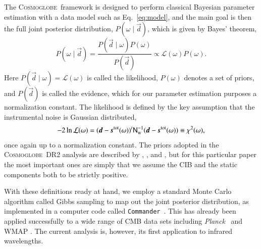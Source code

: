 \documentclass{aa}
\def\commander{\texttt{Commander}}
\def\Planck{\textit{Planck}}
\newcommand{\dv}[0]{\vec{d}}
\newcommand{\s}[0]{\vec{s}}
\newcommand{\N}[0]{\tens{N}}
\newcommand{\cosmoglobe}{\textsc{Cosmoglobe}}
\begin{document}

The \cosmoglobe\ framework is designed to perform classical Bayesian
parameter estimation with a data model such as Eq.~\eqref{eq:model},
and the main goal is then the full joint posterior distribution,
$P(\omega\mid\dv)$, which is given by Bayes' theorem,
\begin{equation}
P(\omega\mid\dv) = \frac{P(\dv\mid\omega) P(\omega)}{P(\dv)} \propto
\mathcal{L}(\omega) P(\omega).
\end{equation}
Here $P(\dv\mid\omega) = \mathcal{L}(\omega)$ is called the likelihood,
$P(\omega)$ denotes a set of priors, and $P(\dv)$ is called the evidence,
which for our parameter estimation purposes a 
normalization constant. The likelihood is defined by the key assumption that
the instrumental noise is Gaussian distributed,
\begin{equation}
-2\ln\mathcal{L}(\omega) = (\dv-\s^{\mathrm{tot}}(\omega))^t
  \N_{\mathrm{w}}^{-1}(\dv-\s^{\mathrm{tot}}(\omega)) \equiv \chi^2(\omega),
\end{equation}
once again up to a normalization constant. The priors
adopted in the \cosmoglobe\ DR2 analysis are described by
\citet{CG02_01}, \citet{CG02_02}, and \citet{CG02_04}, but for this particular paper the
most important ones are simply that we assume the CIB and the
static components both to be strictly positive. 

With these definitions ready at hand, we employ a standard Monte Carlo
algorithm called Gibbs sampling \citep[e.g.,][]{geman:1984} to map out
the joint posterior distribution, as implemented in a computer code
called \commander\ \citep{eriksen:2004,seljebotn:2019,bp03}. This has
already been applied successfully to a wide range of CMB data sets
including \Planck\ \citep{planck2014-a12,bp01} and WMAP
\citep{watts2023_dr1}. The current analysis is, however, its first
application to infrared wavelengths.
\end{document}
